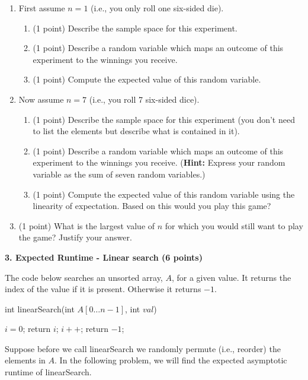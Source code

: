 \documentclass[12pt]{elsart}
\begin{document}
\begin{enumerate}
   \item  First assume $n=1$ (i.e., you only roll one six-sided die). 
\begin{enumerate}
   	\item  (1 point) Describe the sample space for this experiment.
  	 \item (1 point) Describe a random variable which maps an outcome of this experiment to the winnings you receive.
  	 \item (1 point)  Compute the expected value of this random variable.
\end{enumerate}
   \item  Now assume $n=7$ (i.e., you roll 7 six-sided dice). 
\begin{enumerate}
   	\item (1 point) Describe the sample space for this experiment (you don't need to list the elements but describe what is contained in it).
   	\item (1 point) Describe a random variable which maps an outcome of this experiment to the winnings you receive. ({\bf Hint:} Express your random variable as the sum of seven random variables.)
 	  \item  (1 point) Compute the expected value of this random variable using the linearity of expectation.  Based on this would you play this game?
\end{enumerate}
   \item  (1 point) What is the largest value of $n$ for which you would still want to play the game?  Justify your answer.
\end{enumerate}

{\bf 3. Expected Runtime - Linear search (6 points)}

The code below searches an unsorted array, $A$, for a given value.  It returns the index of the value if it is present.  Otherwise it returns $-1$.

\begin{algorithm}
\caption{int linearSearch(int $A[0\ldots n-1]$, int $val$)}
 \begin{algorithmic}
 \State $i = 0$;
       \State return $i$;
    \EndIf
    \State $i++$;
  \EndWhile
 \State return $-1$;
\end{algorithmic}
\end{algorithm}

Suppose before we call linearSearch we randomly permute (i.e., reorder) the elements in $A$.  In the following problem, we will find the expected asymptotic runtime of linearSearch.
\end{document}
